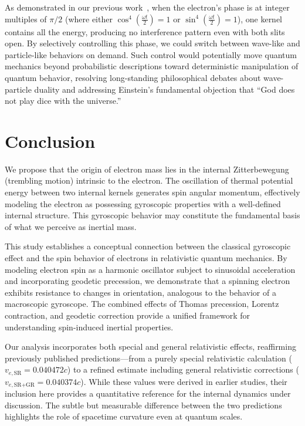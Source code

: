 \documentclass[%
 reprint,
 amsmath,amssymb,
 aps,
]{revtex4-1}
\numberwithin{equation}{section}%
\begin{document}
As demonstrated in our previous work~\cite{hanamura2019}, when the electron's phase is at integer multiples of $\pi /2$ (where either $\cos^4\left(\frac{\omega t}{2}\right)=1$ or $\sin^4\left(\frac{\omega t}{2}\right) =1$), one kernel contains all the energy, producing no interference pattern even with both slits open. By selectively controlling this phase, we could switch between wave-like and particle-like behaviors on demand. Such control would potentially move quantum mechanics beyond probabilistic descriptions toward deterministic manipulation of quantum behavior, resolving long-standing philosophical debates about wave-particle duality and addressing Einstein's fundamental objection that ``God does not play dice with the universe.''


\section{Conclusion}

We propose that the origin of electron mass lies in the internal Zitterbewegung (trembling motion) intrinsic to the electron. The oscillation of thermal potential energy between two internal kernels generates spin angular momentum, effectively modeling the electron as possessing gyroscopic properties with a well-defined internal structure. This gyroscopic behavior may constitute the fundamental basis of what we perceive as inertial mass.

This study establishes a conceptual connection between the classical gyroscopic effect and the spin behavior of electrons in relativistic quantum mechanics. By modeling electron spin as a harmonic oscillator subject to sinusoidal acceleration and incorporating geodetic precession, we demonstrate that a spinning electron exhibits resistance to changes in orientation, analogous to the behavior of a macroscopic gyroscope. The combined effects of Thomas precession, Lorentz contraction, and geodetic correction provide a unified framework for understanding spin-induced inertial properties.

Our analysis incorporates both special and general relativistic effects, reaffirming previously published predictions—from a purely special relativistic calculation ($v_{e,\text{SR}} = 0.040472c$) to a refined estimate including general relativistic corrections ($v_{e,\text{SR+GR}} = 0.040374c$). While these values were derived in earlier studies, their inclusion here provides a quantitative reference for the internal dynamics under discussion. The subtle but measurable difference between the two predictions highlights the role of spacetime curvature even at quantum scales.
\end{document}
